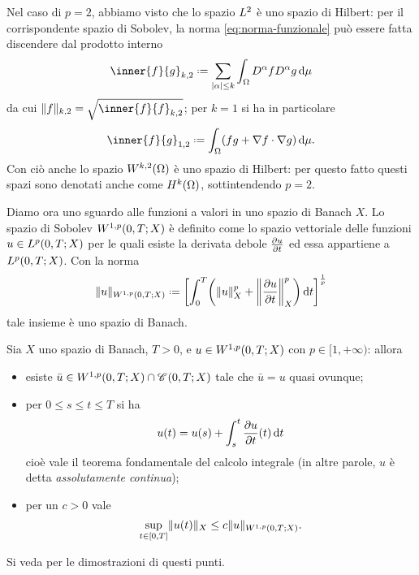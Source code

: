 Nel caso di $p=2$, abbiamo visto che lo spazio $\lclass[2]$ è uno spazio di Hilbert: per il corrispondente spazio di Sobolev, la norma \eqref{eq:norma-funzionale} può essere fatta discendere dal prodotto interno
\begin{equation}
    \inner{f}{g}_{k,2}\defeq
    \sum_{\abs{\alpha}\le k}\int_\Omega D^\alpha fD^\alpha g\,\dd\mu
    \label{eq:prodotto-interno-Wk2}
\end{equation}
da cui $\norm{f}_{k,2}=\sqrt{\inner{f}{f}_{k,2}}$; per $k=1$ si ha in particolare
\begin{equation}
    \inner{f}{g}_{1,2}\defeq
    \int_\Omega (fg+\scalar{\grad f}{\grad g})\,\dd\mu.
    \label{eq:prodotto-interno-W12}
\end{equation}
Con ciò anche lo spazio $\sobW[k,2]{\Omega}$ è uno spazio di Hilbert: per questo fatto questi spazi sono denotati anche come $\sobH[k]{\Omega}$, sottintendendo $p=2$.

Diamo ora uno sguardo alle funzioni a valori in uno spazio di Banach $X$.
Lo spazio di Sobolev $\sobW[1,p]{0,T;X}$ è definito come lo spazio vettoriale delle funzioni $u\in\leb[p]{0,T;X}$ per le quali esiste la derivata debole $\drp{u}{t}$ ed essa appartiene a $\leb[p]{0,T;X}$.
Con la norma
\begin{equation}
    \norm{u}_{\sobW[1,p]{0,T;X}}\defeq\biggl[\int_0^T\biggl(\norm{u}_X^p+\norm[\bigg]{\drp{u}{t}}_X^p\biggr)\,\dd t\biggr]^\frac1{p}
    \label{eq:norma-sobolev-banach}
\end{equation}
tale insieme è uno spazio di Banach.
\begin{teorema}
    Sia $X$ uno spazio di Banach, $T>0$, e $u\in\sobW[1,p]{0,T;X}$ con $p\in[1,+\infty)$: allora
    \begin{itemize}
        \item esiste $\bar{u}\in\sobW[1,p]{0,T;X}\cap\cont{0,T;X}$ tale che $\bar{u}=u$ quasi ovunque;
        \item per $0\le s\le t\le T$ si ha
            \begin{equation}
                u(t)=u(s)+\int_s^t\drp{u}{t}(t)\,\dd t
            \end{equation}
            cioè vale il teorema fondamentale del calcolo integrale (in altre parole, $u$ è detta \emph{assolutamente continua});
        \item per un $c>0$ vale
            \begin{equation}
                \sup_{t\in[0,T]}\norm{u(t)}_X\le c\norm{u}_{\sobW[1,p]{0,T;X}}.
            \end{equation}
    \end{itemize}
\end{teorema}
Si veda \cite[cap.~6A]{pde:hunter} per le dimostrazioni di questi punti.

